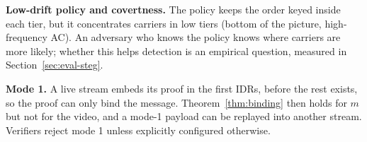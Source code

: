 \textbf{Low-drift policy and covertness.} The policy keeps the order keyed inside each tier, but it concentrates carriers in low tiers (bottom of the picture, high-frequency AC). An adversary who knows the policy knows where carriers are more likely; whether this helps detection is an empirical question, measured in Section~\ref{sec:eval-steg}.

\textbf{Mode 1.} A live stream embeds its proof in the first IDRs, before the rest exists, so the proof can only bind the message. Theorem~\ref{thm:binding} then holds for $m$ but not for the video, and a mode-1 payload can be replayed into another stream. Verifiers reject mode 1 unless explicitly configured otherwise.
